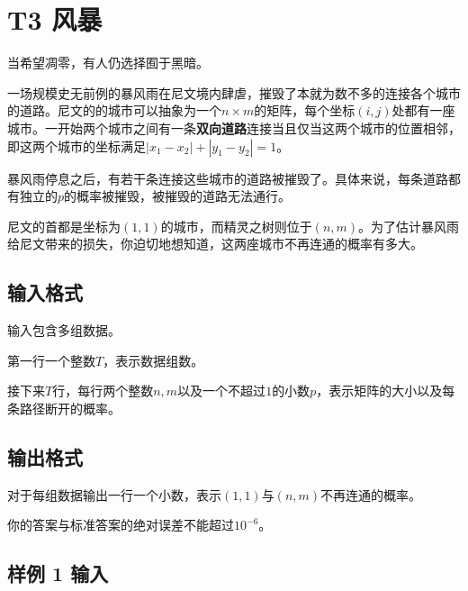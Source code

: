 \documentclass[12pt]{article}
\date{}
\begin{document}
\pagestyle{main}

\setcounter{section}{2}

\section{T3 风暴}

当希望凋零，有人仍选择囿于黑暗。\par

一场规模史无前例的暴风雨在尼文境内肆虐，摧毁了本就为数不多的连接各个城市的道路。尼文的的城市可以抽象为一个$n\times m$的矩阵，每个坐标$(i, j)$处都有一座城市。一开始两个城市之间有一条\textbf{双向道路}连接当且仅当这两个城市的位置相邻，即这两个城市的坐标满足$|x_1 - x_2| + |y_1 - y_2| = 1$。\par
暴风雨停息之后，有若干条连接这些城市的道路被摧毁了。具体来说，每条道路都有独立的$p$的概率被摧毁，被摧毁的道路无法通行。\par
尼文的首都是坐标为$(1, 1)$的城市，而精灵之树则位于$(n, m)$。为了估计暴风雨给尼文带来的损失，你迫切地想知道，这两座城市不再连通的概率有多大。\par

\subsection{输入格式}

输入包含多组数据。\par
第一行一个整数$T$，表示数据组数。\par
接下来$T$行，每行两个整数$n, m$以及一个不超过$1$的小数$p$，表示矩阵的大小以及每条路径断开的概率。

\subsection{输出格式}

对于每组数据输出一行一个小数，表示$(1, 1)$与$(n, m)$不再连通的概率。\par
你的答案与标准答案的绝对误差不能超过$10^{-6}$。

\subsection{样例 1 输入}
\end{document}
